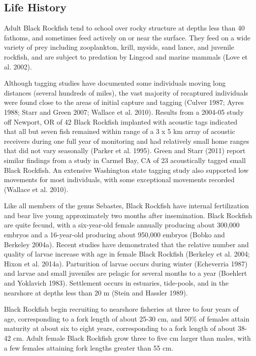 \documentclass[11pt,
  english,
  letterpaper,
]{article}
\begin{document}
\hypertarget{life-history}{%
\subsection{Life History}\label{life-history}}

Adult Black Rockfish tend to school over rocky structure at depths less than 40 fathoms, and sometimes feed actively on or near the surface. They feed on a wide variety of prey including zooplankton, krill, mysids, sand lance, and juvenile rockfish, and are subject to predation by Lingcod and marine mammals (Love et al. 2002).

Although tagging studies have documented some individuals moving long distances (several hundreds of miles), the vast majority of recaptured individuals were found close to the areas of initial capture and tagging (Culver 1987; Ayres 1988; Starr and Green 2007; Wallace et al. 2010). Results from a 2004-05 study off Newport, OR of 42 Black Rockfish implanted with acoustic tags indicated that all but seven fish remained within range of a 3 x 5 km array of acoustic receivers during one full year of monitoring and had relatively small home ranges that did not vary seasonally (Parker et al. 1995). Green and Starr (2011) report similar findings from a study in Carmel Bay, CA of 23 acoustically tagged small Black Rockfish. An extensive Washington state tagging study also supported low movements for most individuals, with some exceptional movements recorded (Wallace et al. 2010).

Like all members of the genus Sebastes, Black Rockfish have internal fertilization and bear live young approximately two months after insemination. Black Rockfish are quite fecund, with a six-year-old female annually producing about 300,000 embryos and a 16-year-old producing about 950,000 embryos (Bobko and Berkeley 2004a). Recent studies have demonstrated that the relative number and quality of larvae increase with age in female Black Rockfish (Berkeley et al. 2004; Hixon et al. 2014a). Parturition of larvae occurs during winter (Echeverria 1987) and larvae and small juveniles are pelagic for several months to a year (Boehlert and Yoklavich 1983). Settlement occurs in estuaries, tide-pools, and in the nearshore at depths less than 20 m (Stein and Hassler 1989).

Black Rockfish begin recruiting to nearshore fisheries at three to four years of age, corresponding to a fork length of about 25-30 cm, and 50\% of females attain maturity at about six to eight years, corresponding to a fork length of about 38-42 cm. Adult female Black Rockfish grow three to five cm larger than males, with a few females attaining fork lengths greater than 55 cm.
\end{document}
